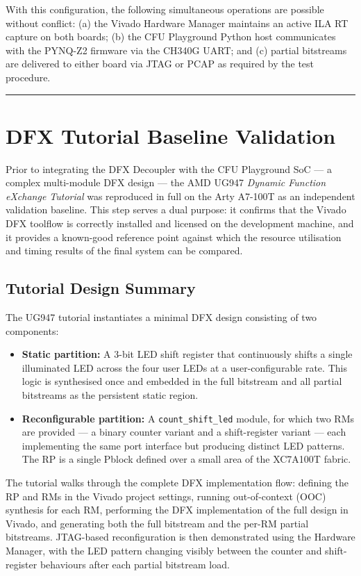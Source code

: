 With this configuration, the following simultaneous operations are possible without conflict: (a) the Vivado Hardware Manager maintains an active ILA RT capture on both boards; (b) the CFU Playground Python host communicates with the PYNQ-Z2 firmware via the CH340G UART; and (c) partial bitstreams are delivered to either board via JTAG or PCAP as required by the test procedure.

\vspace{0.4em}\hrule\vspace{0.4em}

\section{DFX Tutorial Baseline Validation}

Prior to integrating the DFX Decoupler with the CFU Playground SoC — a complex multi-module DFX design — the AMD UG947 \textit{Dynamic Function eXchange Tutorial} was reproduced in full on the Arty A7-100T as an independent validation baseline. This step serves a dual purpose: it confirms that the Vivado DFX toolflow is correctly installed and licensed on the development machine, and it provides a known-good reference point against which the resource utilisation and timing results of the final system can be compared.

\subsection{Tutorial Design Summary}

The UG947 tutorial instantiates a minimal DFX design consisting of two components:

\begin{itemize}
  \item \textbf{Static partition:} A 3-bit LED shift register that continuously shifts a single illuminated LED across the four user LEDs at a user-configurable rate. This logic is synthesised once and embedded in the full bitstream and all partial bitstreams as the persistent static region.
  \item \textbf{Reconfigurable partition:} A \texttt{count\_shift\_led} module, for which two RMs are provided — a binary counter variant and a shift-register variant — each implementing the same port interface but producing distinct LED patterns. The RP is a single Pblock defined over a small area of the XC7A100T fabric.
\end{itemize}
The tutorial walks through the complete DFX implementation flow: defining the RP and RMs in the Vivado project settings, running out-of-context (OOC) synthesis for each RM, performing the DFX implementation of the full design in Vivado, and generating both the full bitstream and the per-RM partial bitstreams. JTAG-based reconfiguration is then demonstrated using the Hardware Manager, with the LED pattern changing visibly between the counter and shift-register behaviours after each partial bitstream load.

